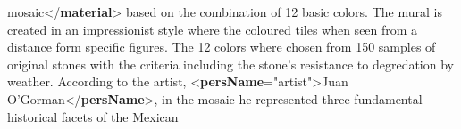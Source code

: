 \begin{shaded}
\hspace*{1em}\hspace*{1em}\hspace*{1em}\hspace*{1em}\hspace*{1em}\hspace*{1em}\hspace*{1em}\hspace*{1em}\hspace*{1em}\hspace*{1em} mosaic{</\textbf{material}>} based on the combination of 12 basic colors. The mural is created in an\mbox{}\newline 
\hspace*{1em}\hspace*{1em}\hspace*{1em}\hspace*{1em}\hspace*{1em}\hspace*{1em}\hspace*{1em}\hspace*{1em} impressionist style where the coloured tiles when seen from a distance form specific figures. The 12\mbox{}\newline 
\hspace*{1em}\hspace*{1em}\hspace*{1em}\hspace*{1em}\hspace*{1em}\hspace*{1em}\hspace*{1em}\hspace*{1em} colors where chosen from 150 samples of original stones with the criteria including the stone's\mbox{}\newline 
\hspace*{1em}\hspace*{1em}\hspace*{1em}\hspace*{1em}\hspace*{1em}\hspace*{1em}\hspace*{1em}\hspace*{1em} resistance to degredation by weather. According to the artist, {<\textbf{persName}\hspace*{1em}{role}="{artist}">}Juan\mbox{}\newline 
\hspace*{1em}\hspace*{1em}\hspace*{1em}\hspace*{1em}\hspace*{1em}\hspace*{1em}\hspace*{1em}\hspace*{1em}\hspace*{1em}\hspace*{1em} O'Gorman{</\textbf{persName}>}, in the mosaic he represented three fundamental historical facets of the Mexican\mbox{}\newline 

\end{shaded}
